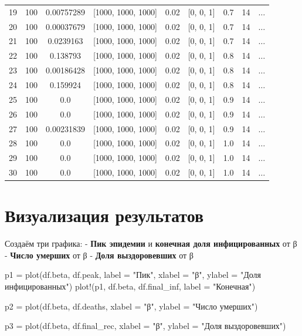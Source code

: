 \documentclass[
  12pt,
  a4paper,
  DIV=11,
  numbers=noendperiod]{scrreprt}
\newenvironment{Shaded}{\begin{snugshade}}{\end{snugshade}}
\newcommand{\FunctionTok}[1]{\textcolor[rgb]{0.28,0.35,0.67}{#1}}
\newcommand{\NormalTok}[1]{\textcolor[rgb]{0.00,0.23,0.31}{#1}}
\newcommand{\OperatorTok}[1]{\textcolor[rgb]{0.37,0.37,0.37}{#1}}
\newcommand{\StringTok}[1]{\textcolor[rgb]{0.13,0.47,0.30}{#1}}
\begin{document}
\begin{tabular}{r|cccccccc}
    19 & 100 & 0.00757289 & [1000, 1000, 1000] & 0.02 & [0, 0, 1] & 0.7 & 14 & $\dots$ \\
    20 & 100 & 0.00037679 & [1000, 1000, 1000] & 0.02 & [0, 0, 1] & 0.7 & 14 & $\dots$ \\
    21 & 100 & 0.0239163 & [1000, 1000, 1000] & 0.02 & [0, 0, 1] & 0.7 & 14 & $\dots$ \\
    22 & 100 & 0.138793 & [1000, 1000, 1000] & 0.02 & [0, 0, 1] & 0.8 & 14 & $\dots$ \\
    23 & 100 & 0.00186428 & [1000, 1000, 1000] & 0.02 & [0, 0, 1] & 0.8 & 14 & $\dots$ \\
    24 & 100 & 0.159924 & [1000, 1000, 1000] & 0.02 & [0, 0, 1] & 0.8 & 14 & $\dots$ \\
    25 & 100 & 0.0 & [1000, 1000, 1000] & 0.02 & [0, 0, 1] & 0.9 & 14 & $\dots$ \\
    26 & 100 & 0.0 & [1000, 1000, 1000] & 0.02 & [0, 0, 1] & 0.9 & 14 & $\dots$ \\
    27 & 100 & 0.00231839 & [1000, 1000, 1000] & 0.02 & [0, 0, 1] & 0.9 & 14 & $\dots$ \\
    28 & 100 & 0.0 & [1000, 1000, 1000] & 0.02 & [0, 0, 1] & 1.0 & 14 & $\dots$ \\
    29 & 100 & 0.0 & [1000, 1000, 1000] & 0.02 & [0, 0, 1] & 1.0 & 14 & $\dots$ \\
    30 & 100 & 0.0 & [1000, 1000, 1000] & 0.02 & [0, 0, 1] & 1.0 & 14 & $\dots$ \\
\end{tabular}

\section{Визуализация
результатов}\label{ux432ux438ux437ux443ux430ux43bux438ux437ux430ux446ux438ux44f-ux440ux435ux437ux443ux43bux44cux442ux430ux442ux43eux432-3}

Создаём три графика: - \textbf{Пик эпидемии} и \textbf{конечная доля
инфицированных} от β - \textbf{Число умерших} от β - \textbf{Доля
выздоровевших} от β

\begin{Shaded}
\begin{Highlighting}[]
\NormalTok{p1 }\OperatorTok{=} \FunctionTok{plot}\NormalTok{(df.beta, df.peak, label }\OperatorTok{=} \StringTok{"Пик"}\NormalTok{, xlabel }\OperatorTok{=} \StringTok{"β"}\NormalTok{, ylabel }\OperatorTok{=} \StringTok{"Доля инфицированных"}\NormalTok{)}
\FunctionTok{plot!}\NormalTok{(p1, df.beta, df.final\_inf, label }\OperatorTok{=} \StringTok{"Конечная"}\NormalTok{)}

\NormalTok{p2 }\OperatorTok{=} \FunctionTok{plot}\NormalTok{(df.beta, df.deaths, xlabel }\OperatorTok{=} \StringTok{"β"}\NormalTok{, ylabel }\OperatorTok{=} \StringTok{"Число умерших"}\NormalTok{)}

\NormalTok{p3 }\OperatorTok{=} \FunctionTok{plot}\NormalTok{(df.beta, df.final\_rec, xlabel }\OperatorTok{=} \StringTok{"β"}\NormalTok{, ylabel }\OperatorTok{=} \StringTok{"Доля выздоровевших"}\NormalTok{)}
\end{Highlighting}
\end{Shaded}
\end{document}
